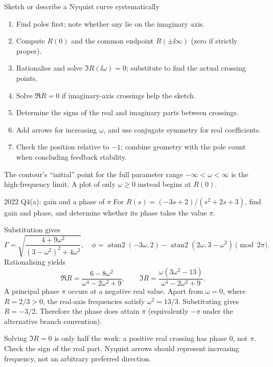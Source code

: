 \begin{method}{Sketch or describe a Nyquist curve systematically}
\begin{enumerate}
\item Find poles first; note whether any lie on the imaginary axis.
\item Compute $R(0)$ and the common endpoint $R(\pm\ii\infty)$ (zero if strictly proper).
\item Rationalise and solve $\Im R(\ii\omega)=0$; substitute to find the actual crossing points.
\item Solve $\Re R=0$ if imaginary-axis crossings help the sketch.
\item Determine the signs of the real and imaginary parts between crossings.
\item Add arrows for increasing $\omega$, and use conjugate symmetry for real coefficients.
\item Check the position relative to $-1$; combine geometry with the pole count when concluding feedback stability.
\end{enumerate}
The contour's ``initial'' point for the full parameter range $-\infty<\omega<\infty$ is the high-frequency limit. A plot of only $\omega\geq0$ instead begins at $R(0)$.
\end{method}
\begin{question}{2022 Q4(a): gain and a phase of $\pi$}
For $R(s)=(-3s+2)/(s^2+2s+3)$, find gain and phase, and determine whether its phase takes the value $\pi$.
\end{question}
\begin{answer}
Substitution gives
\[\Gamma=\sqrt{\frac{4+9\omega^2}{(3-\omega^2)^2+4\omega^2}},\quad
\phi=\operatorname{atan2}(-3\omega,2)-\operatorname{atan2}(2\omega,3-\omega^2)\pmod{2\pi}.\]
Rationalising yields
\[\Re R=\frac{6-8\omega^2}{\omega^4-2\omega^2+9},\qquad\Im R=\frac{\omega(3\omega^2-13)}{\omega^4-2\omega^2+9}.\]
A principal phase $\pi$ occurs at a negative real value. Apart from $\omega=0$, where $R=2/3>0$, the real-axis frequencies satisfy $\omega^2=13/3$. Substituting gives $R=-3/2$. Therefore the phase does attain $\pi$ (equivalently $-\pi$ under the alternative branch convention).
\end{answer}
\begin{tip}
Solving $\Im R=0$ is only half the work: a positive real crossing has phase $0$, not $\pi$. Check the sign of the real part. Nyquist arrows should represent increasing frequency, not an arbitrary preferred direction.
\end{tip}

